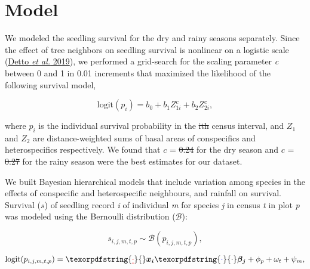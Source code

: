 \documentclass[
  12pt,
  letterpaper,
  DIV=11,
  numbers=noendperiod]{scrartcl}
\author{}
\date{}
\providecommand{\DIFaddtex}[1]{{\protect\color{blue}\uwave{#1}}} %
\providecommand{\DIFdeltex}[1]{{\protect\color{red}\sout{#1}}}                      %
\providecommand{\DIFaddbegin}{} %
\providecommand{\DIFaddend}{} %
\providecommand{\DIFdelbegin}{} %
\providecommand{\DIFdelend}{} %
\providecommand{\DIFadd}[1]{\texorpdfstring{\DIFaddtex{#1}}{#1}} %
\providecommand{\DIFdel}[1]{\texorpdfstring{\DIFdeltex{#1}}{}} %
\newcommand{\DIFscaledelfig}{0.5}
\newlength{\DIFdelgraphicswidth} %
\newlength{\DIFdelgraphicsheight} %
\newcommand{\DIFaddincludegraphics}[2][]{{\color{blue}\fbox{\DIFOincludegraphics[#1]{#2}}}} %
\newcommand{\DIFdelincludegraphics}[2][]{%
\sbox{\DIFdelgraphicsbox}{\DIFOincludegraphics[#1]{#2}}%
\settoboxwidth{\DIFdelgraphicswidth}{\DIFdelgraphicsbox} %
\settoboxtotalheight{\DIFdelgraphicsheight}{\DIFdelgraphicsbox} %
\scalebox{\DIFscaledelfig}{%
\parbox[b]{\DIFdelgraphicswidth}{\usebox{\DIFdelgraphicsbox}\\[-\baselineskip] \rule{\DIFdelgraphicswidth}{0em}}\llap{\resizebox{\DIFdelgraphicswidth}{\DIFdelgraphicsheight}{%
\setlength{\unitlength}{\DIFdelgraphicswidth}%
\begin{picture}(1,1)%
\thicklines\linethickness{2pt} %
{\color[rgb]{1,0,0}\put(0,0){\framebox(1,1){}}}%
{\color[rgb]{1,0,0}\put(0,0){\line( 1,1){1}}}%
{\color[rgb]{1,0,0}\put(0,1){\line(1,-1){1}}}%
\end{picture}%
}\hspace*{3pt}}} %
} %
\DeclareRobustCommand{\DIFaddbegin}{\DIFOaddbegin \let\includegraphics\DIFaddincludegraphics} %
\DeclareRobustCommand{\DIFaddend}{\DIFOaddend \let\includegraphics\DIFOincludegraphics} %
\DeclareRobustCommand{\DIFdelbegin}{\DIFOdelbegin \let\includegraphics\DIFdelincludegraphics} %
\DeclareRobustCommand{\DIFdelend}{\DIFOaddend \let\includegraphics\DIFOincludegraphics} %
\begin{document}
\ifdefined\Shaded\DIFdelbegin %
\DIFdelend \DIFaddbegin \renewenvironment{Shaded}{\begin{tcolorbox}[frame hidden, borderline west={3pt}{0pt}{shadecolor}, interior hidden, enhanced, breakable, sharp corners, boxrule=0pt]}{\end{tcolorbox}}\DIFaddend \fi

\hypertarget{model}{%
\section{Model}\label{model}}

We modeled the seedling survival for the dry and rainy seasons
separately. Since the effect of tree neighbors on seedling survival is
nonlinear on a logistic scale (\protect\hyperlink{ref-Detto2019}{Detto
\emph{et al.} 2019}), we performed a grid-search for the scaling
parameter \emph{c} between 0 and 1 in 0.01 increments that maximized the
likelihood of the following survival model,

\[
\mathrm{logit}(p_i) = b_0 + b_1 Z_{1i}^c + b_2 Z_{2i}^c,
\]

where \(p_i\) is the individual survival probability in the \DIFdelbegin \DIFdel{ith }\DIFdelend \DIFaddbegin \emph{\DIFadd{i}}\DIFadd{th
}\DIFaddend census interval, and \(Z_1\) and \(Z_2\) are distance-weighted sums of
basal areas of conspecifics and heterospecifics respectively. We found
that \(c\) = \DIFdelbegin \DIFdel{0.24 }\DIFdelend \DIFaddbegin \DIFadd{0.27 }\DIFaddend for the dry season and \(c\) = \DIFdelbegin \DIFdel{0.27 }\DIFdelend \DIFaddbegin \DIFadd{0.24 }\DIFaddend for the rainy
season were the best estimates for our dataset.

We built Bayesian hierarchical models that include variation among
species in the effects of conspecific and heterospecific neighbours, and
rainfall on survival. Survival (\(s\)) of seedling record \emph{i} of
individual \emph{m} for species \emph{j} in census \emph{t} in plot
\emph{p} was modeled using the Bernoulli distribution (\(\mathcal{B}\)):

\[
s_{i,j,m,t,p} \sim \mathcal{B}(p_{i, j, m, t, p}),
\]

\[
\mathrm{logit}(p_{i,j,m,t,p}) = \DIFdelbegin %
\DIFdel{\cdot }\DIFdelend \boldsymbol{x_{i}} \DIFaddbegin \DIFadd{\cdot }\boldsymbol{\beta_{j}} \DIFaddend + \phi_p + \omega_t + \psi_m,
\]
\end{document}

